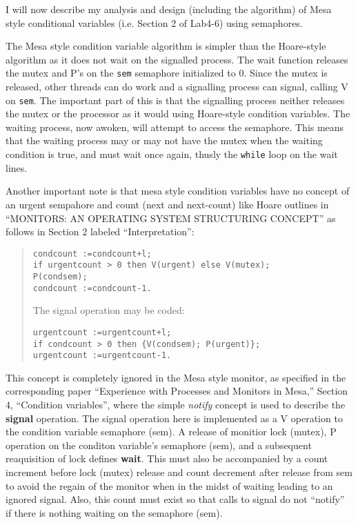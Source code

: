 \documentclass[11pt]{article}
\begin{document}
\begin{question}

    I will now describe my analysis and design (including the algorithm) of Mesa style conditional variables (i.e. Section 2 of Lab4-6) using semaphores.

    The Mesa style condition variable algorithm is simpler than the Hoare-style algorithm as it does not wait on the signalled process. The wait function releases the mutex and P's on the {\tt sem} semaphore initialized to 0. Since the mutex is released, other threads can do work and a signalling process can signal, calling V on {\tt sem}. The important part of this is that the signalling process neither releases the mutex or the processor as it would using Hoare-style condition variables. The waiting process, now awoken, will attempt to access the semaphore. This means that the waiting process may or may not have the mutex when the waiting condition is true, and must wait once again, thusly the {\tt while} loop on the wait lines.

    Another important note is that mesa style condition variables have no concept of an urgent sempahore and count (next and next-count) like Hoare outlines in ``MONITORS: AN OPERATING SYSTEM STRUCTURING CONCEPT'' as follows in Section 2 labeled ``Interpretation'':

    \begin{quote}
        \begin{verbatim}
condcount :=condcount+l;
if urgentcount > 0 then V(urgent) else V(mutex);
P(condsem);
condcount :=condcount-1.
        \end{verbatim}
    The signal operation may be coded:
        \begin{verbatim}
urgentcount :=urgentcount+l;
if condcount > 0 then {V(condsem); P(urgent)};
urgentcount :=urgentcount-1.
        \end{verbatim}
    \end{quote}

    This concept is completely ignored in the Mesa style monitor, as specified in the corresponding paper ``Experience with Processes and Monitors in Mesa,'' Section 4, ``Condition variables'', where the simple {\it notify} concept is used to describe the {\bf signal} operation. The signal operation here is implemented as a V operation to the condition variable semaphore (sem). A release of monitior lock (mutex), P operation on the conditon variable's semaphore (sem), and a subsequent reaquisition of lock defines {\bf wait}. This must also be accompanied by a count increment before lock (mutex) release and count decrement after release from sem to avoid the regain of the monitor when in the midst of waiting leading to an ignored signal. Also, this count must exist so that calls to signal do not ``notify'' if there is nothing waiting on the semaphore (sem).

\end{question}
\end{document}
